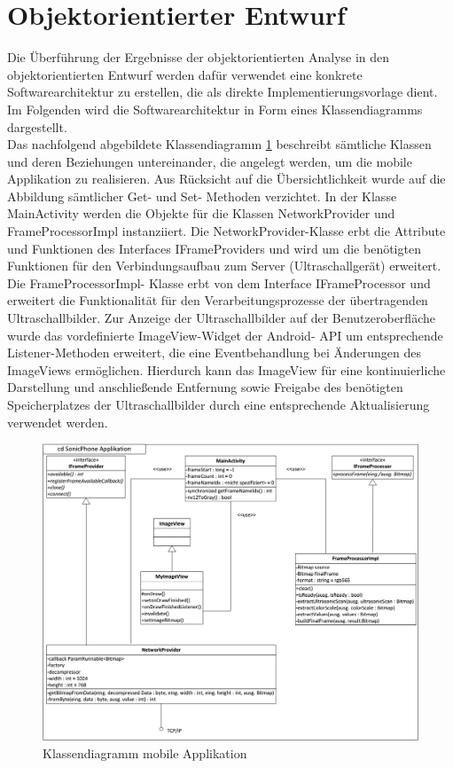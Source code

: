 \section{Objektorientierter Entwurf}
Die Überführung der Ergebnisse der objektorientierten Analyse in den  objektorientierten Entwurf werden dafür verwendet eine konkrete Softwarearchitektur zu erstellen, die als direkte Implementierungsvorlage dient. Im Folgenden wird die Softwarearchitektur in Form eines Klassendiagramms dargestellt. \\
Das nachfolgend abgebildete Klassendiagramm \ref{fig:cd_mobileApplikation} beschreibt sämtliche Klassen und deren Beziehungen untereinander, die angelegt werden, um die mobile Applikation zu realisieren. Aus Rücksicht auf die Übersichtlichkeit wurde auf die Abbildung sämtlicher Get- und Set- Methoden verzichtet. In der Klasse MainActivity werden die Objekte für die Klassen NetworkProvider und FrameProcessorImpl instanziiert. Die NetworkProvider-Klasse erbt die Attribute und Funktionen des Interfaces IFrameProviders und wird um die benötigten Funktionen für den Verbindungsaufbau zum Server (Ultraschallgerät) erweitert. Die FrameProcessorImpl- Klasse erbt von dem Interface IFrameProcessor und erweitert die Funktionalität für den Verarbeitungsprozesse der übertragenden Ultraschallbilder. Zur Anzeige der Ultraschallbilder auf der Benutzeroberfläche wurde das vordefinierte ImageView-Widget der Android- API um entsprechende Listener-Methoden erweitert, die eine Eventbehandlung bei Änderungen des ImageViews ermöglichen. Hierdurch kann das ImageView  für eine kontinuierliche Darstellung und anschließende Entfernung sowie Freigabe des benötigten Speicherplatzes der Ultraschallbilder durch eine entsprechende Aktualisierung verwendet werden.  

\begin{figure}[H] 
\centering
\includegraphics[width=1\textwidth]{Bilder/objektorientierteAnalyseundEntwurf/cd_mobileApplikation}
\caption{{\small Klassendiagramm mobile Applikation}}
\label{fig:cd_mobileApplikation}
\end{figure}
